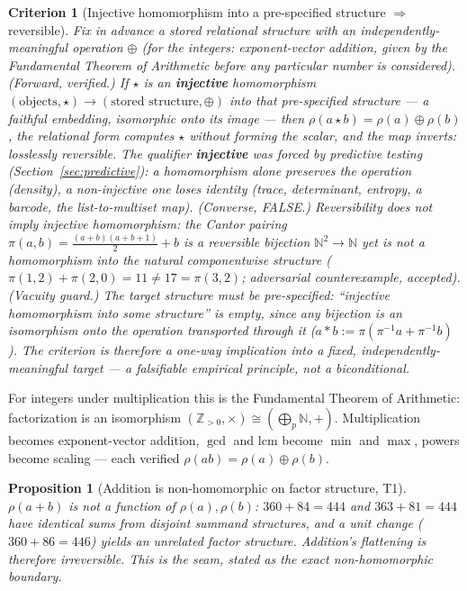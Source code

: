 \documentclass[11pt]{article}
\newtheorem{proposition}{Proposition}[section]
\newtheorem{criterion}{Criterion}[section]
\begin{document}
\begin{criterion}[Injective homomorphism into a pre-specified structure $\Rightarrow$ reversible]
Fix in advance a stored relational structure with an \emph{independently-meaningful} operation $\oplus$
(for the integers: exponent-vector addition, given by the Fundamental Theorem of Arithmetic before any
particular number is considered). \emph{(Forward, verified.)} If $\star$ is an \textbf{injective} homomorphism
$(\text{objects},\star)\to(\text{stored structure},\oplus)$ into that pre-specified structure --- a faithful
embedding, isomorphic onto its image --- then $\rho(a\star b)=\rho(a)\oplus\rho(b)$, the relational form
computes $\star$ without forming the scalar, and the map inverts: losslessly reversible. The qualifier
\textbf{injective} was forced by predictive testing (Section~\ref{sec:predictive}): a homomorphism alone
preserves the operation (density), a non-injective one loses identity (trace, determinant, entropy, a
barcode, the list-to-multiset map). \emph{(Converse, FALSE.)} Reversibility does \emph{not} imply injective
homomorphism: the Cantor pairing $\pi(a,b)=\tfrac{(a+b)(a+b+1)}{2}+b$ is a reversible bijection
$\mathbb{N}^2\!\to\!\mathbb{N}$ yet is not a homomorphism into the natural componentwise structure
($\pi(1,2)+\pi(2,0)=11\neq 17=\pi(3,2)$; adversarial counterexample, accepted). \emph{(Vacuity guard.)} The
target structure must be pre-specified: ``injective homomorphism into \emph{some} structure'' is empty, since
any bijection is an isomorphism onto the operation transported through it ($a\ast b:=\pi(\pi^{-1}a+\pi^{-1}b)$).
The criterion is therefore a one-way implication into a fixed, independently-meaningful target --- a
falsifiable empirical principle, not a biconditional.
\end{criterion}

For integers under multiplication this is the Fundamental Theorem of Arithmetic: factorization is an
isomorphism $(\mathbb{Z}_{>0},\times)\cong(\bigoplus_p\mathbb{N},+)$. Multiplication becomes exponent-vector
addition, $\gcd$ and $\mathrm{lcm}$ become $\min$ and $\max$, powers become scaling --- each verified
$\rho(ab)=\rho(a)\oplus\rho(b)$.

\begin{proposition}[Addition is non-homomorphic on factor structure, T1]
$\rho(a+b)$ is not a function of $\rho(a),\rho(b)$: $360+84=444$ and $363+81=444$ have identical sums from
disjoint summand structures, and a unit change ($360+86=446$) yields an unrelated factor structure.
Addition's flattening is therefore irreversible. This is the seam, stated as the exact non-homomorphic
boundary.
\end{proposition}
\end{document}
